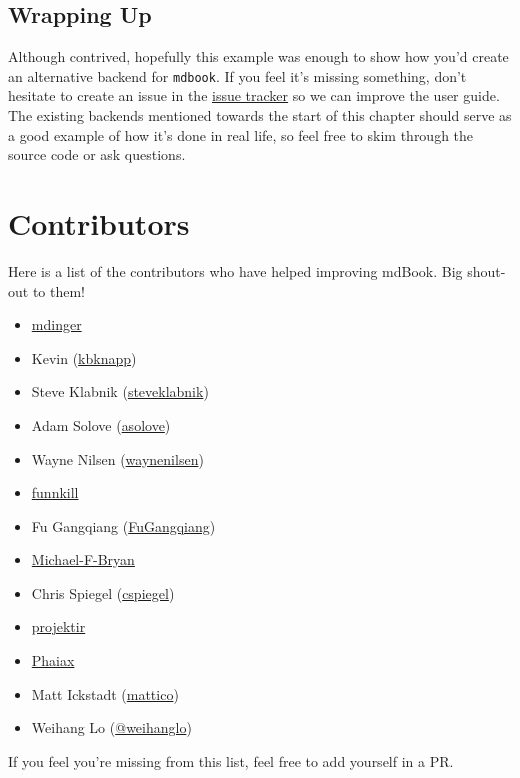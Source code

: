 \documentclass{article}
\begin{document}
\subsection{Wrapping Up}
\label{Wrapping Up}
\label{wrapping-up}

Although contrived, hopefully this example was enough to show how you'd create
an alternative backend for \lstinline|mdbook|. If you feel it's missing something, don't
hesitate to create an issue in the \href{https://github.com/rust-lang-nursery/mdBook/issues}{issue tracker} so we can improve the user
guide.\\

The existing backends mentioned towards the start of this chapter should serve
as a good example of how it's done in real life, so feel free to skim through
the source code or ask questions.\\

\section{Contributors}
\label{Contributors}
\label{contributors}

Here is a list of the contributors who have helped improving mdBook. Big
shout-out to them!\\
\begin{itemize}
\item \href{https://github.com/mdinger}{mdinger}
\item Kevin (\href{https://github.com/kbknapp}{kbknapp})
\item Steve Klabnik (\href{https://github.com/steveklabnik}{steveklabnik})
\item Adam Solove (\href{https://github.com/asolove}{asolove})
\item Wayne Nilsen (\href{https://github.com/waynenilsen}{waynenilsen})
\item \href{https://github.com/funkill}{funnkill}
\item Fu Gangqiang (\href{https://github.com/FuGangqiang}{FuGangqiang})
\item \href{https://github.com/Michael-F-Bryan}{Michael-F-Bryan}
\item Chris Spiegel (\href{https://github.com/cspiegel}{cspiegel})
\item \href{https://github.com/projektir}{projektir}
\item \href{https://github.com/Phaiax}{Phaiax}
\item Matt Ickstadt (\href{https://github.com/mattico}{mattico})
\item Weihang Lo (\href{https://github.com/weihanglo}{@weihanglo})
\end{itemize}

If you feel you're missing from this list, feel free to add yourself in a PR.\\
\end{document}
